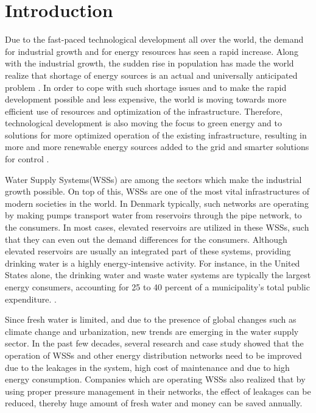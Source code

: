 \chapter{Introduction}
\label{introduction}

Due to the fast-paced technological development all over the world, the demand for industrial growth and for energy resources has seen a rapid increase. Along with the industrial growth, the sudden rise in population has made the world realize that shortage of energy sources is an actual and universally anticipated problem \cite{sustainable_water}. In order to cope with such shortage issues and to make the rapid development possible and less expensive, the world is moving towards more efficient use of resources and optimization of the infrastructure. Therefore, technological development is also moving the focus to green energy and to solutions for more optimized operation of the existing infrastructure, resulting in more and more renewable energy sources added to the grid and smarter solutions for control \cite{fluctuating_price}. 

Water Supply Systems(WSSs) are among the sectors which make the industrial growth possible. On top of this, WSSs are one of the most vital infrastructures of modern societies in the world. In Denmark typically, such networks are operating by making pumps transport water from reservoirs through the pipe network, to the consumers. In most cases, elevated reservoirs are utilized in these WSSs, such that they can even out the demand differences for the consumers. Although elevated reservoirs are usually an integrated part of these systems, providing drinking water is a highly energy-intensive activity. For instance, in the United States alone, the drinking water and waste water systems are typically the largest energy consumers, accounting for 25 to 40 percent of a municipality's total public expenditure. \cite{appelbaum2002water}. 

Since fresh water is limited, and due to the presence of global changes such as climate change and urbanization, new trends are emerging in the water supply sector. In the past few decades, several research and case study showed that the operation of WSSs and other energy distribution networks need to be improved due to the leakages in the system, high cost of maintenance and due to high energy consumption. Companies which are operating WSSs also realized that by using proper pressure management in their networks, the effect of leakages can be reduced, thereby huge amount of fresh water and money can be saved annually\cite{national2005public}. 

